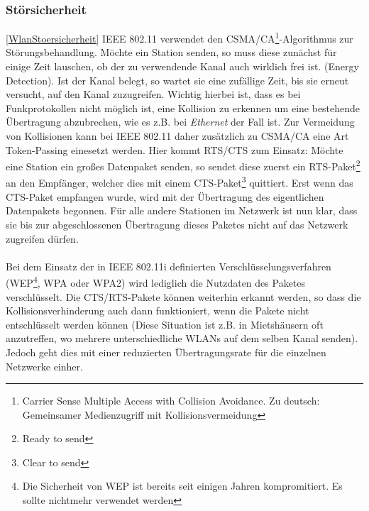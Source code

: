         \subsubsection{Störsicherheit}\ref{WlanStoersicherheit}
            IEEE 802.11 verwendet den CSMA/CA\footnote{Carrier Sense Multiple Access with 
            Collision Avoidance. Zu deutsch: Gemeinsamer Medienzugriff mit Kollisionsvermeidung}-Algorithmus
            zur Störungsbehandlung. Möchte ein Station senden, so muss diese zunächst
            für einige Zeit lauschen, ob der zu verwendende Kanal auch wirklich frei ist.
            (Energy Detection).
            Ist der Kanal belegt, so wartet sie eine zufällige Zeit, bis sie erneut versucht,
            auf den Kanal zuzugreifen. Wichtig hierbei ist, dass es bei Funkprotokollen nicht
            möglich ist, eine Kollision zu erkennen um eine bestehende Übertragung abzubrechen,
            wie es z.B. bei \textsl{Ethernet} der Fall ist. Zur Vermeidung von Kollisionen
            kann bei IEEE 802.11 daher zusätzlich zu CSMA/CA eine Art Token-Passing einesetzt
            werden. Hier kommt RTS/CTS zum Einsatz: Möchte eine Station ein großes Datenpaket
            senden, so sendet diese zuerst ein RTS-Paket\footnote{Ready to send} an den Empfänger, 
            welcher dies mit einem CTS-Paket\footnote{Clear to send} quittiert. Erst wenn das
            CTS-Paket empfangen wurde, wird mit der Übertragung des eigentlichen Datenpakets
            begonnen. Für alle andere Stationen im Netzwerk ist nun klar, dass sie bis zur
            abgeschlossenen Übertragung dieses Paketes nicht auf das Netzwerk zugreifen
            dürfen.\\
            \\
            Bei dem Einsatz der in IEEE 802.11i definierten Verschlüsselungsverfahren
            (WEP\footnote{Die Sicherheit von WEP ist bereits seit einigen Jahren
             kompromitiert. Es sollte nichtmehr verwendet werden}, WPA oder WPA2) wird
            lediglich die Nutzdaten des Paketes verschlüsselt. Die CTS/RTS-Pakete können
            weiterhin erkannt werden, so dass die Kollisionsverhinderung auch dann
            funktioniert, wenn die Pakete nicht entschlüsselt werden können (Diese 
            Situation ist z.B. in Mietshäusern oft anzutreffen, wo mehrere 
            unterschiedliche WLANs auf dem selben Kanal senden). Jedoch geht dies
            mit einer reduzierten Übertragungsrate für die einzelnen Netzwerke
            einher.\\
